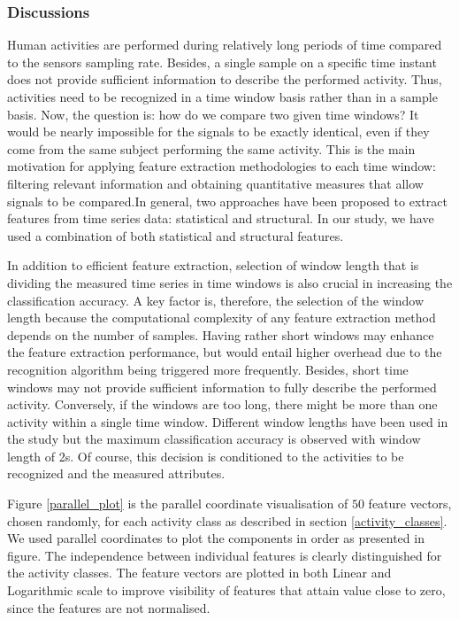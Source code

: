 \documentclass[
10pt,           %
a4paper,        %
oneside,        %
headinclude,footinclude, %
]{scrartcl}
\begin{document}
\subsubsection{Discussions}
Human activities are performed during relatively long periods of time compared to the sensors sampling rate. Besides, a single sample on a specific time instant does not provide sufficient information to describe the performed activity. Thus, activities need to be recognized in a time window basis rather than in a sample basis. Now, the question is: how do we compare two given time windows? It would be nearly impossible for the signals to be exactly identical, even if they come from the same subject performing the same activity. This is the main motivation for applying feature extraction methodologies \cite{Guyon2003} \cite{Chen2006} to each time window: filtering relevant information and obtaining quantitative measures that allow signals to be compared.In general, two approaches have been proposed to extract features from time series data: statistical and structural. In our study, we have used a combination of both statistical and structural features.

In addition to efficient feature extraction, selection of window length that is dividing the measured time series in time windows is also crucial in increasing the classification accuracy. A key factor is, therefore, the selection of the window length because the computational complexity of any feature extraction method depends on the number of samples. Having rather short windows may enhance the feature extraction performance, but would entail higher overhead due to the recognition algorithm being triggered more frequently. Besides, short time windows may not provide sufficient information to fully describe the performed activity. Conversely, if the windows are too long, there might be more than one activity within a single time window. Different window lengths have been used in the study but the maximum classification accuracy is observed with window length of 2s. Of course, this decision is conditioned to the activities to be recognized and the measured attributes.

Figure \ref{parallel_plot} is the parallel coordinate visualisation \cite{Wegman1990} of $50$ feature vectors, chosen randomly, for each activity class as described in section \ref{activity_classes}. We used parallel coordinates to plot the components in order as presented in figure. The independence between individual features is clearly distinguished for the activity classes. The feature vectors are plotted in both Linear and Logarithmic scale to improve visibility of features that attain value close to zero, since the features are not normalised.
\end{document}
